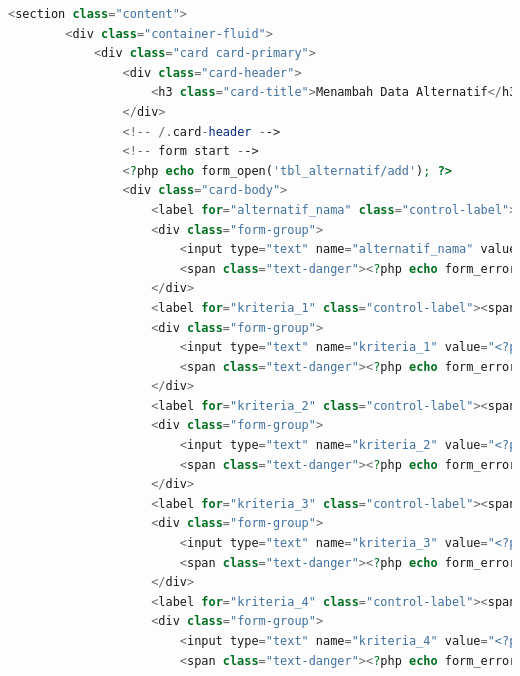 \begin{lstlisting}[language=PHP]
	<section class="content"> 
	    <div class="container-fluid">  
	        <div class="card card-primary">  
	            <div class="card-header">  
	                <h3 class="card-title">Menambah Data Alternatif</h3>  
	            </div>  
	            <!-- /.card-header -->  
	            <!-- form start -->  
	            <?php echo form_open('tbl_alternatif/add'); ?>  
	            <div class="card-body">  
	                <label for="alternatif_nama" class="control-label"><span class="text-danger">*</span>Nama Alternatif</label>  
	                <div class="form-group">  
	                    <input type="text" name="alternatif_nama" value="<?php echo $this->input->post('alternatif_nama'); ?>" class="form-control" id="alternatif_nama" />  
	                    <span class="text-danger"><?php echo form_error('alternatif_nama'); ?></span>  
	                </div>  
	                <label for="kriteria_1" class="control-label"><span class="text-danger">*</span>Harga</label>  
	                <div class="form-group">  
	                    <input type="text" name="kriteria_1" value="<?php echo $this->input->post('kriteria_1'); ?>" class="form-control" id="kriteria_1" />  
	                    <span class="text-danger"><?php echo form_error('kriteria_1'); ?></span>  
	                </div>  
	                <label for="kriteria_2" class="control-label"><span class="text-danger">*</span>Kamera belakang</label>  
	                <div class="form-group">  
	                    <input type="text" name="kriteria_2" value="<?php echo $this->input->post('kriteria_2'); ?>" class="form-control" id="kriteria_2" />  
	                    <span class="text-danger"><?php echo form_error('kriteria_2'); ?></span>  
	                </div> 
	                <label for="kriteria_3" class="control-label"><span class="text-danger">*</span>Kamera depan</label>  
	                <div class="form-group">  
	                    <input type="text" name="kriteria_3" value="<?php echo $this->input->post('kriteria_3'); ?>" class="form-control" id="kriteria_3" />  
	                    <span class="text-danger"><?php echo form_error('kriteria_3'); ?></span>  
	                </div>  
	                <label for="kriteria_4" class="control-label"><span class="text-danger">*</span>Memori</label>  
	                <div class="form-group">  
	                    <input type="text" name="kriteria_4" value="<?php echo $this->input->post('kriteria_4'); ?>" class="form-control" id="kriteria_4" />  
	                    <span class="text-danger"><?php echo form_error('kriteria_4'); ?></span>  

\end{lstlisting}
